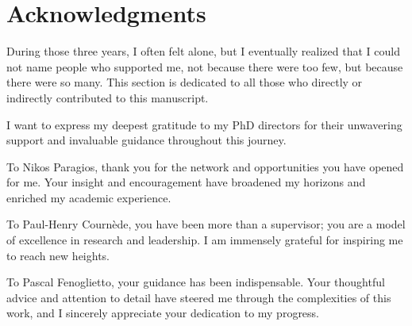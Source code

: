 \chapter*{Acknowledgments}
During those three years, I often felt alone, but I eventually realized that I could not name people who supported me, not because there were too few, but because there were so many.
This section is dedicated to all those who directly or indirectly contributed to this manuscript.

I want to express my deepest gratitude to my PhD directors for their unwavering support and invaluable guidance throughout this journey.

To Nikos Paragios, thank you for the network and opportunities you have opened for me.
Your insight and encouragement have broadened my horizons and enriched my academic experience.

To Paul-Henry Cournède, you have been more than a supervisor; you are a model of excellence in research and leadership.
I am immensely grateful for inspiring me to reach new heights.

To Pascal Fenoglietto, your guidance has been indispensable.
Your thoughtful advice and attention to detail have steered me through the complexities of this work, and I sincerely appreciate your dedication to my progress.

